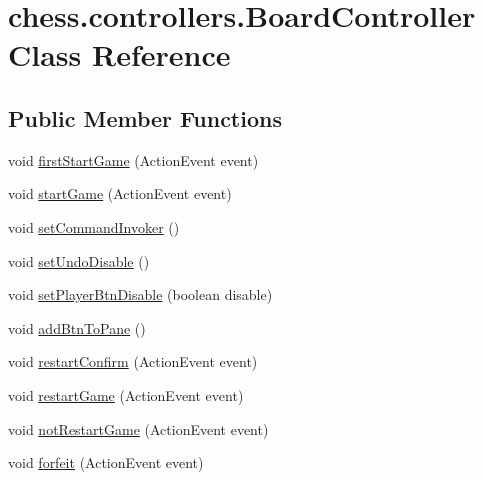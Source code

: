 \hypertarget{classchess_1_1controllers_1_1_board_controller}{}\section{chess.\+controllers.\+Board\+Controller Class Reference}
\label{classchess_1_1controllers_1_1_board_controller}
\subsection*{Public Member Functions}
\begin{DoxyCompactItemize}
\item 
void \mbox{\hyperlink{classchess_1_1controllers_1_1_board_controller_a655a4185aa49e122521d08dc5b658844}{first\+Start\+Game}} (Action\+Event event)
\item 
void \mbox{\hyperlink{classchess_1_1controllers_1_1_board_controller_a99cc48c279febe873defd5c1e03686ad}{start\+Game}} (Action\+Event event)
\item 
void \mbox{\hyperlink{classchess_1_1controllers_1_1_board_controller_a4e6051a9cb52b74376bc36ce2e43951d}{set\+Command\+Invoker}} ()
\item 
void \mbox{\hyperlink{classchess_1_1controllers_1_1_board_controller_aa792ea9ac6c34a71651010ffd907ca43}{set\+Undo\+Disable}} ()
\item 
void \mbox{\hyperlink{classchess_1_1controllers_1_1_board_controller_a9d5d98fb3dcb39922e715a1182a4bd7c}{set\+Player\+Btn\+Disable}} (boolean disable)
\item 
void \mbox{\hyperlink{classchess_1_1controllers_1_1_board_controller_ab576456eca49c7f7e65c1aaaa5317b39}{add\+Btn\+To\+Pane}} ()
\item 
void \mbox{\hyperlink{classchess_1_1controllers_1_1_board_controller_a0f5c79b2c05dd9ff037844f6877e301d}{restart\+Confirm}} (Action\+Event event)
\item 
void \mbox{\hyperlink{classchess_1_1controllers_1_1_board_controller_a72b59496c1c41ab9219f24ef95643fef}{restart\+Game}} (Action\+Event event)
\item 
void \mbox{\hyperlink{classchess_1_1controllers_1_1_board_controller_a834efae1222a50d010cd4a61b7cdeddf}{not\+Restart\+Game}} (Action\+Event event)
\item 
void \mbox{\hyperlink{classchess_1_1controllers_1_1_board_controller_a7d0d4bce0ebb4a04cc36efa8ec32ef69}{forfeit}} (Action\+Event event)
\item 

\end{DoxyCompactItemize}
